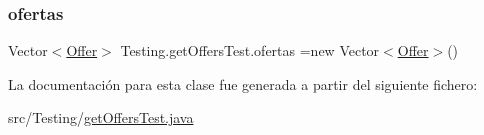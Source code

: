 \mbox{\label{class_testing_1_1get_offers_test_a2031e3e284394c2ae6a3fbeae0e0c539}} 
\subsubsection{\texorpdfstring{ofertas}{ofertas}}
{\footnotesize\ttfamily Vector$<$\mbox{\hyperlink{classdomain_1_1_offer}{Offer}}$>$ Testing.\+get\+Offers\+Test.\+ofertas =new Vector$<$\mbox{\hyperlink{classdomain_1_1_offer}{Offer}}$>$()}



La documentación para esta clase fue generada a partir del siguiente fichero\+:\begin{DoxyCompactItemize}
\item 
src/\+Testing/\mbox{\hyperlink{get_offers_test_8java}{get\+Offers\+Test.\+java}}\end{DoxyCompactItemize}
